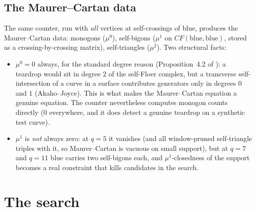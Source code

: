 \documentclass[11pt,reqno]{amsart}
\theoremstyle{plain}
\theoremstyle{definition}
\newcommand{\CF}{\mathit{CF}}
\begin{document}
\subsection{The Maurer--Cartan data}\label{ss:mc}
The same counter, run with \emph{all} vertices at self-crossings of blue, produces the
Maurer--Cartan data: monogons ($\mu^0$), self-bigons ($\mu^1$ on $\CF(\mathrm{blue},
\mathrm{blue})$, stored as a crossing-by-crossing matrix), self-triangles ($\mu^2$). Two
structural facts:
\begin{itemize}
\item $\mu^0=0$ always, for the standard degree reason (Proposition~4.2 of \cite{P2}): a
teardrop would sit in degree $2$ of the self-Floer complex, but a transverse self-intersection
of a curve in a surface contributes generators only in degrees $0$ and $1$ (Akaho--Joyce).
This is what makes the Maurer--Cartan equation a genuine equation. The counter nevertheless
computes monogon counts directly ($0$ everywhere, and it does detect a genuine teardrop on a
synthetic test curve).
\item $\mu^1$ is \emph{not} always zero: at $q=5$ it vanishes (and all
window-pruned self-triangle triples with it, so Maurer--Cartan is vacuous on small support),
but at $q=7$ and $q=11$ blue carries two self-bigons each, and $\mu^1$-closedness of the
support becomes a real constraint that kills candidates in the search.
\end{itemize}

\section{The search}\label{sec:search}
\end{document}
